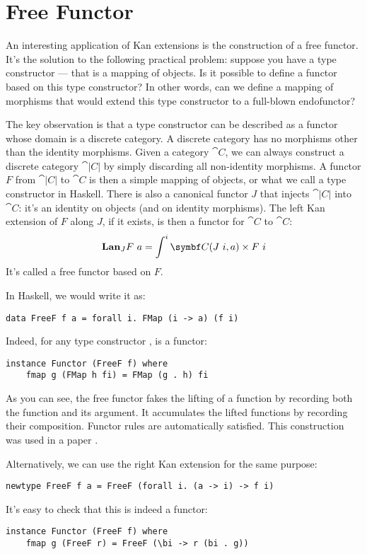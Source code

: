 \section{Free Functor}

An interesting application of Kan extensions is the construction of a
free functor. It's the solution to the following practical problem:
suppose you have a type constructor --- that is a mapping of objects. Is
it possible to define a functor based on this type constructor? In other
words, can we define a mapping of morphisms that would extend this type
constructor to a full-blown endofunctor?

The key observation is that a type constructor can be described as a
functor whose domain is a discrete category. A discrete category has no
morphisms other than the identity morphisms. Given a category $\cat{C}$,
we can always construct a discrete category $\cat{|C|}$
by simply discarding all non-identity morphisms. A functor $F$
from $\cat{|C|}$ to $\cat{C}$ is then a simple mapping
of objects, or what we call a type constructor in Haskell. There is also
a canonical functor $J$ that injects $\cat{|C|}$
into $\cat{C}$: it's an identity on objects (and on identity morphisms).
The left Kan extension of $F$ along $J$, if it exists, is
then a functor for $\cat{C}$ to $\cat{C}$:
\[\Lan_{J}F\ a = \int^i \cat{C}(J\ i, a)\times{}F\ i\]
It's called a free functor based on $F$.

In Haskell, we would write it as:

\begin{Verbatim}
data FreeF f a = forall i. FMap (i -> a) (f i)
\end{Verbatim}
Indeed, for any type constructor ,  is a
functor:

\begin{Verbatim}
instance Functor (FreeF f) where
    fmap g (FMap h fi) = FMap (g . h) fi
\end{Verbatim}
As you can see, the free functor fakes the lifting of a function by
recording both the function and its argument. It accumulates the lifted
functions by recording their composition. Functor rules are
automatically satisfied. This construction was used in a paper
.

Alternatively, we can use the right Kan extension for the same purpose:

\begin{Verbatim}
newtype FreeF f a = FreeF (forall i. (a -> i) -> f i)
\end{Verbatim}
It's easy to check that this is indeed a functor:

\begin{Verbatim}
instance Functor (FreeF f) where
    fmap g (FreeF r) = FreeF (\bi -> r (bi . g))
\end{Verbatim}